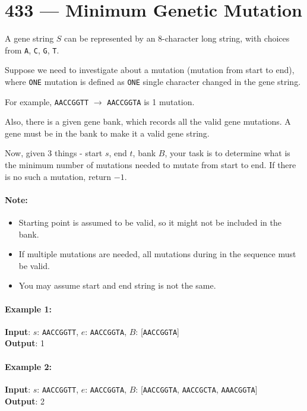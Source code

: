 \section{433 --- Minimum Genetic Mutation}
A gene string $S$ can be represented by an 8-character long string, with choices from \texttt{A}, \texttt{C}, \texttt{G}, \texttt{T}.

Suppose we need to investigate about a mutation (mutation from start to end), where \texttt{ONE} mutation is defined as \texttt{ONE} single character changed in the gene string.

For example, \texttt{AACCGGTT} $\longrightarrow$ \texttt{AACCGGTA} is 1 mutation.

Also, there is a given gene bank, which records all the valid gene mutations. A gene must be in the bank to make it a valid gene string.

Now, given 3 things - start $s$, end $t$, bank $B$, your task is to determine what is the minimum number of mutations needed to mutate from start to end. If there is no such a mutation, return $-1$.

\paragraph{Note:}

\begin{itemize}
\item Starting point is assumed to be valid, so it might not be included in the bank.
\item If multiple mutations are needed, all mutations during in the sequence must be valid.
\item You may assume start and end string is not the same.
\end{itemize}
 

\paragraph{Example 1:}

\begin{flushleft}
\textbf{Input}: $s$: \texttt{AACCGGTT}, $e$: \texttt{AACCGGTA}, $B$: [\texttt{AACCGGTA}]
\\
\textbf{Output}: 1
\end{flushleft}
 

\paragraph{Example 2:}
\begin{flushleft}
\textbf{Input}: $s$: \texttt{AACCGGTT}, $e$: \texttt{AACCGGTA}, $B$: [\texttt{AACCGGTA}, \texttt{AACCGCTA}, \texttt{AAACGGTA}]
\\
\textbf{Output}: 2
\end{flushleft} 


